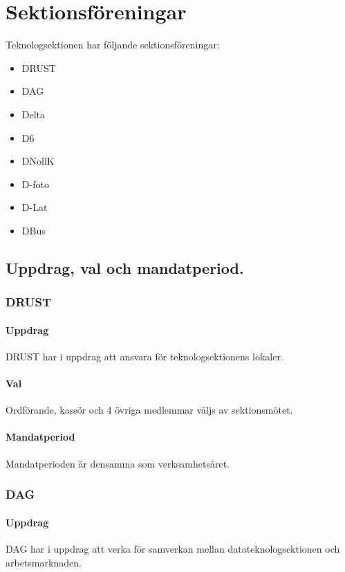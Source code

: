 \section{Sektionsföreningar}

Teknologsektionen har följande sektionsföreningar: 
\begin{itemize}
  \item DRUST 
  \item DAG 
  \item Delta 
  \item D6 
  \item DNollK
  \item D-foto
  \item D-Lat
  \item DBus
\end{itemize}

\subsection{Uppdrag, val och mandatperiod.}

\subsubsection{DRUST} 

\paragraph{Uppdrag}
DRUST har i uppdrag att ansvara för teknologsektionens lokaler.

\paragraph{Val}
Ordförande, kassör och 4 övriga medlemmar väljs av sektionsmötet. 

\paragraph{Mandatperiod}
Mandatperioden är densamma som verksamhetsåret. 

\subsubsection{DAG}

\paragraph{Uppdrag} 
DAG har i uppdrag att verka för samverkan mellan datateknologsektionen och arbetsmarknaden. 

